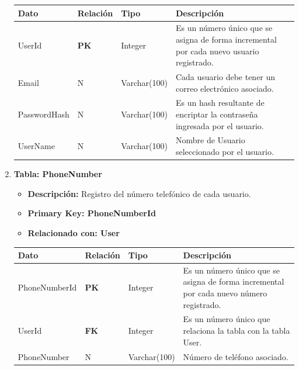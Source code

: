 \documentclass[12pt]{article}
\begin{document}
\begin{enumerate}
\begin{table}[!h]
        \begin{tabular}{|p{3cm}|p{2cm}|p{2.5cm}|p{8cm}|}
             \hline
             \textbf{Dato} & \textbf{Relación} & \textbf{Tipo} & \textbf{Descripción} \\
             \hline
             UserId & \textbf{PK} & Integer & Es un número único que se asigna de forma incremental por cada nuevo usuario registrado. \\
             \hline
             Email & N & Varchar(100) & Cada usuario debe tener un correo electrónico asociado. \\
             \hline
             PasswordHash & N & Varchar(100) & Es un hash resultante de encriptar la contraseña ingresada por el usuario. \\
             \hline
             UserName & N & Varchar(100) & Nombre de Usuario seleccionado por el usuario.\\
             \hline
        \end{tabular}
    \end{table}
    \newpage
    \item \textbf{Tabla: PhoneNumber}
    \begin{itemize}
        \item \textbf{Descripción:} Registro del número telefónico de cada usuario.
        \item \textbf{Primary Key: PhoneNumberId}
        \item \textbf{Relacionado con: User}
    \end{itemize}
    \begin{table}[!h]
        \centering
        \begin{tabular}{|p{3cm}|p{2cm}|p{2.5cm}|p{8cm}|}
             \hline
             \textbf{Dato} & \textbf{Relación} & \textbf{Tipo} & \textbf{Descripción} \\
             \hline
             PhoneNumberId & \textbf{PK} & Integer & Es un número único que se asigna de forma incremental por cada nuevo número registrado. \\
             \hline
             UserId & \textbf{FK} & Integer & Es un número único que relaciona la tabla con la tabla User. \\
             \hline
             PhoneNumber & N & Varchar(100) & Número de teléfono asociado. \\
             \hline
        \end{tabular}
    \end{table}
    

\end{enumerate}
\end{document}
